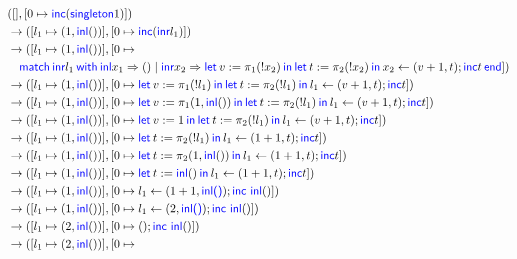 \documentclass{article}
\begin{document}
\begin{align*}
     & ([], [0 \mapsto \langkw{inc} (\langkw{singleton} 1)])                                       \\
     & \cstepsto ([l_1 \mapsto (1, \Inl())], [0 \mapsto \langkw{inc} (\Inr l_1)])                  \\
     & \cstepsto ([l_1 \mapsto (1, \Inl())], [0 \mapsto                                            \\ & \quad
    \Match{\Inr l_1}with{\Inl x_1}=>{()}|{\Inr x_2}=>{
    \Let{v}={\pi_1(!x_2)}in \Let{t}={\pi_2(!x_2)}in{x_2 \leftarrow (v+1, t); \langkw{inc} t}
    }end])                                                                                         \\
     & \cstepsto ([l_1 \mapsto (1, \Inl())], [0 \mapsto
    \Let{v}={\pi_1(!l_1)}in \Let{t}={\pi_2(!l_1)}in{l_1 \leftarrow (v+1, t); \langkw{inc} t}])     \\
     & \cstepsto ([l_1 \mapsto (1, \Inl())], [0 \mapsto
    \Let{v}={\pi_1(1,\Inl())}in \Let{t}={\pi_2(!l_1)}in{l_1 \leftarrow (v+1, t); \langkw{inc} t}]) \\
     & \cstepsto ([l_1 \mapsto (1, \Inl())], [0 \mapsto
    \Let{v}={1}in \Let{t}={\pi_2(!l_1)}in{l_1 \leftarrow (v+1, t); \langkw{inc} t}])               \\
     & \cstepsto ([l_1 \mapsto (1, \Inl())], [0 \mapsto
    \Let{t}={\pi_2(!l_1)}in{l_1 \leftarrow (1+1, t); \langkw{inc} t}])                             \\
     & \cstepsto ([l_1 \mapsto (1, \Inl())], [0 \mapsto
    \Let{t}={\pi_2(1, \Inl())}in{l_1 \leftarrow (1+1, t); \langkw{inc} t}])                        \\
     & \cstepsto ([l_1 \mapsto (1, \Inl())], [0 \mapsto
    \Let{t}={\Inl()}in{l_1 \leftarrow (1+1, t); \langkw{inc} t}])                                  \\
     & \cstepsto ([l_1 \mapsto (1, \Inl())], [0 \mapsto
    l_1 \leftarrow (1+1, \langkw{\Inl()}); \langkw{inc} \ \Inl()])                                 \\
     & \cstepsto ([l_1 \mapsto (1, \Inl())], [0 \mapsto
    l_1 \leftarrow (2, \langkw{\Inl()}); \langkw{inc} \ \Inl()])                                   \\
     & \cstepsto ([l_1 \mapsto (2, \Inl())], [0 \mapsto
    (); \langkw{inc} \ \Inl()])                                                                    \\
     & \cstepsto ([l_1 \mapsto (2, \Inl())], [0 \mapsto

\end{align*}
\end{document}
